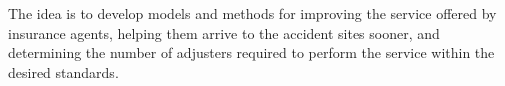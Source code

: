 The idea is to develop models and methods
for improving the service offered by insurance agents,
helping them arrive to the accident sites sooner,
and determining the number of adjusters required
to perform the service within the desired standards.
